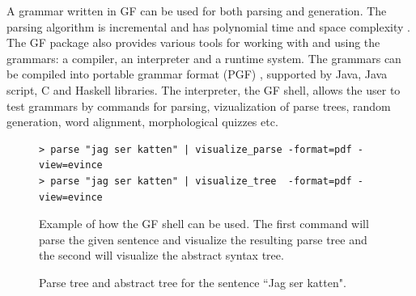 \documentclass{report}
\begin{document}
A grammar written in GF can be used for both parsing and generation.
The parsing algorithm is incremental and has polynomial time and space
complexity \cite{gfMech}. 
The GF package also provides various tools for working with and using the grammars:
a compiler, an interpreter and a runtime system.
The grammars can be compiled into portable grammar format (PGF) \cite{pgf},
supported by %
Java, Java script, C and Haskell libraries. 
The interpreter, the GF shell, allows
the user to test grammars by commands for parsing, vizualization of parse trees,
random generation, word alignment, morphological quizzes etc.
\begin{figure}[h]
\begin{verbatim} 
> parse "jag ser katten" | visualize_parse -format=pdf -view=evince
> parse "jag ser katten" | visualize_tree  -format=pdf -view=evince
\end{verbatim}
\caption{Example of how the GF shell can be used. The first command will parse the given
sentence and visualize the resulting parse tree and the second will visualize the 
abstract syntax tree.}
\label{fig:shellvp}
\end{figure}
\begin{figure}[h]
\centering
{}
\caption{Parse tree and abstract tree for the sentence ``Jag ser katten".}
\label{fig:gftree1}
\end{figure}
\end{document}
